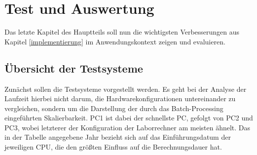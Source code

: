 \section{Test und Auswertung}\label{test}

Das letzte Kapitel des Hauptteils soll nun die wichtigsten Verbesserungen aus Kapitel \ref{implementierung} im Anwendungskontext zeigen und evaluieren.

\subsection{Übersicht der Testsysteme}

Zunächst sollen die Testsysteme vorgestellt werden. Es geht bei der Analyse der Laufzeit hierbei nicht darum, die Hardwarekonfigurationen untereinander zu vergleichen, sondern um die Darstellung der durch das Batch-Processing eingeführten Skalierbarkeit. PC1 ist dabei der schnellste PC, gefolgt von PC2 und PC3, wobei letzterer der Konfiguration der Laborrechner am meisten ähnelt. Das in der Tabelle angegebene Jahr bezieht sich auf das Einführungsdatum der jeweiligen CPU, die den größten Einfluss auf die Berechnungsdauer hat. 


